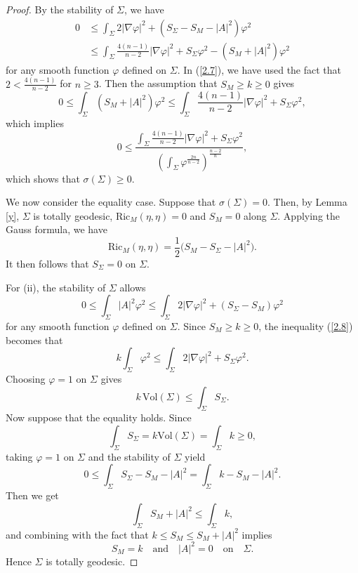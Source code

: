 \documentclass[amssymb,amstex,amsmath,11pt]{article}
\numberwithin{equation}{section}
\theoremstyle{plain}
\theoremstyle{definition}
\theoremstyle{remark}
\newcommand{\is}{\int_{\Sigma}}
\def\Ricm{\textrm{Ric}_M}
\def\vol{\textrm{Vol}}
\begin{document}
\begin{proof}
    By the stability of $\Sigma$, we have
    \begin{align}\label{2.7}
        0 & \leq \is 2|\nabla \varphi|^2+(S_{\Sigma}-S_M-|A|^2)\varphi^2 \nonumber\\
          & \leq \is \frac{4(n-1)}{n-2}|\nabla \varphi|^2 + S_{\Sigma} \varphi^2 - (S_M + |A|^2)\varphi^2
    \end{align}
    for any smooth function $\varphi$ defined on $\Sigma$.
    In (\ref{2.7}), we have used  the fact that $2<\frac{4(n-1)}{n-2}$ for $n\geq3$. Then the assumption  that  $S_M \geq k\geq 0$ gives
    \begin{equation*}
        0 \leq \is (S_M+|A|^2)\varphi^2
          \leq \is \frac{4(n-1)}{n-2}|\nabla \varphi|^2+S_{\Sigma} \varphi^2,
    \end{equation*}
    which implies
    \begin{equation*}
        0 \leq \frac{\is \frac{4(n-1)}{n-2}|\nabla \varphi|^2 + S_{\Sigma}\varphi^2}{\left(\is \varphi^{\frac{2n}{n-2}}\right)^{\frac{n-2}{n}}},
    \end{equation*}
which shows that $\sigma(\Sigma)\geq0$.



We now consider the equality case. Suppose that $\sigma(\Sigma)=0$. Then, by Lemma \ref{y}, $\Sigma$ is totally geodesic, $\Ricm(\eta,\eta)=0$ and $S_M=0$ along $\Sigma$. Applying the Gauss formula, we have
$$
\Ricm(\eta,\eta)=\frac{1}{2}\bigl(S_M-S_\Sigma-|A|^2\bigr).
$$
    It then follows that $S_{\Sigma}=0$ on $\Sigma$.

    For {\rm (ii)}, the stability of $\Sigma$ allows
    \begin{equation}\label{2.8}
        0 \leq \is|A|^2\varphi^2 \leq \is 2|\nabla \varphi|^2 + (S_{\Sigma} - S_M)\varphi^2
    \end{equation}
    for any smooth function $\varphi$ defined on $\Sigma$.
    Since $S_M \geq k \geq 0$, the inequality (\ref{2.8}) becomes that
    $$k\is \varphi^2 \leq \is 2|\nabla \varphi|^2 + S_{\Sigma} \varphi^2.$$
    Choosing $\varphi=1$ on $\Sigma$ gives
    $$k\,\vol(\Sigma) \leq \is S_{\Sigma}.$$
    Now suppose that the equality holds.
    Since $$\is S_{\Sigma} = k\vol(\Sigma) = \is k \geq 0,$$
    taking $\varphi=1$ on $\Sigma$ and the stability of $\Sigma$ yield
    $$0 \leq \is S_{\Sigma} - S_M -|A|^2 =\is k - S_M - |A|^2.$$
    Then we get
    $$\is S_M + |A|^2 \leq \is k,$$
    and combining with the fact that $k \leq S_M \leq S_M + |A|^2$ implies
    $$S_M=k \quad \text{and} \quad |A|^2=0 \quad \text{on} \quad \Sigma.$$
    Hence $\Sigma$ is totally geodesic.
\end{proof}
\end{document}
